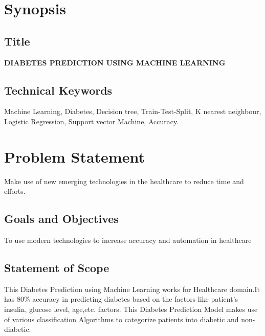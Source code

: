 \documentclass[pdftex,a4paper,11pt,oneside,openright]{report}
\begin{document}
\newpage


\chapter{\bf Synopsis }
\section{\bf Title}
\large{\bf DIABETES PREDICTION USING MACHINE LEARNING}

\section{Technical Keywords}
\Large{Machine Learning, Diabetes, Decision tree, Train-Test-Split, K nearest neighbour, Logistic Regression, Support vector Machine, Accuracy.} 

\chapter{Problem Statement}
\Large{Make use of new emerging technologies in the healthcare to reduce time and efforts.}
\section{Goals and Objectives}
\Large{To use modern technologies to increase accuracy and automation in healthcare}
\section{Statement of Scope}
\Large{This Diabetes Prediction using Machine Learning works for Healthcare domain.It has 80\% accuracy in predicting diabetes based on the factors like patient's insulin, glucose level, age,etc. factors. This Diabetes Prediction Model makes use of various classification Algorithms to categorize patients into diabetic and non-diabetic.}
\end{document}
